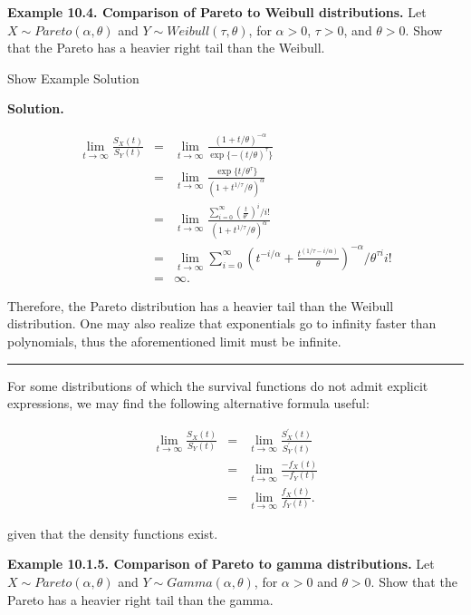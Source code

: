 \documentclass[]{book}
\theoremstyle{definition}
\theoremstyle{definition}
\theoremstyle{definition}
\theoremstyle{remark}
\begin{document}
\textbf{Example 10.4. Comparison of Pareto to Weibull distributions.}
Let \(X\sim Pareto(\alpha, \theta)\) and
\(Y\sim Weibull(\tau, \theta)\), for \(\alpha>0\), \(\tau>0\), and
\(\theta>0\). Show that the Pareto has a heavier right tail than the
Weibull.

Show Example Solution

\hypertarget{toggleExamplePortMgt.1.4}{}
\textbf{Solution.}

\begin{eqnarray*}
    \lim_{t\rightarrow \infty}\frac{S_X(t)}{S_Y(t)} &=& \lim_{t\rightarrow \infty}\frac{(1+t/\theta)^{-\alpha}}{\exp\{-(t/\theta)^{\tau}\}} \\
    &=& \lim_{t\rightarrow \infty}\frac{\exp\{t/\theta^{\tau} \}}{(1+t^{1/\tau}/\theta)^{\alpha}} \\
    &=& \lim_{t\rightarrow \infty}\frac{\sum_{i=0}^{\infty}\left(\frac{t}{\theta^{\tau}}\right)^{i}/i!}{(1+t^{1/\tau}/\theta)^{\alpha}}\\
    &=& \lim_{t\rightarrow \infty} \sum_{i=0}^{\infty} \left(t^{-i/\alpha}+\frac{t^{(1/\tau-i/\alpha)}}{\theta} \right)^{-\alpha}/\theta^{\tau i}i!\\
    &=& \infty.
\end{eqnarray*}

Therefore, the Pareto distribution has a heavier tail than the Weibull
distribution. One may also realize that exponentials go to infinity
faster than polynomials, thus the aforementioned limit must be infinite.

\begin{center}\rule{0.5\linewidth}{\linethickness}\end{center}

For some distributions of which the survival functions do not admit
explicit expressions, we may find the following alternative formula
useful:

\begin{eqnarray*}
    \lim_{t\to \infty} \frac{S_X(t)}{S_Y(t)} &=& \lim_{t \to \infty} \frac{S_X^{'}(t)}{S_Y^{'}(t)} \\
    &=& \lim_{t \to \infty} \frac{-f_X(t)}{-f_Y(t)}\\
 &=& \lim_{t\to \infty} \frac{f_X(t)}{f_Y(t)}.
\end{eqnarray*}

given that the density functions exist.

\textbf{Example 10.1.5. Comparison of Pareto to gamma distributions.}
Let \(X\sim Pareto(\alpha, \theta)\) and
\(Y\sim Gamma(\alpha, \theta)\), for \(\alpha>0\) and \(\theta>0\). Show
that the Pareto has a heavier right tail than the gamma.
\end{document}
